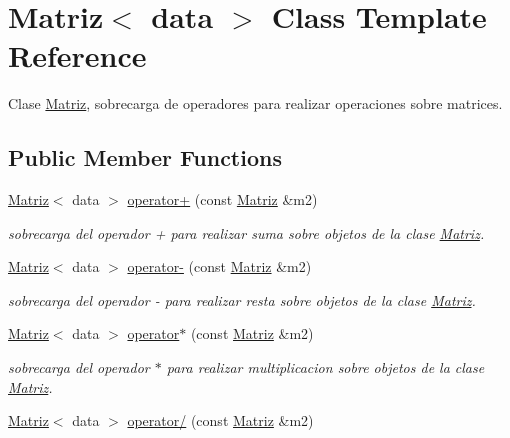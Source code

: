 \hypertarget{classMatriz}{\section{Matriz$<$ data $>$ Class Template Reference}
\label{classMatriz}
}


Clase \hyperlink{classMatriz}{Matriz}, sobrecarga de operadores para realizar operaciones sobre matrices.  


\subsection*{Public Member Functions}
\begin{DoxyCompactItemize}
\item 
\hypertarget{classMatriz_a7c474cdea4e17d6f8619fecd4dabfef2}{\hyperlink{classMatriz}{Matriz}$<$ data $>$ \hyperlink{classMatriz_a7c474cdea4e17d6f8619fecd4dabfef2}{operator+} (const \hyperlink{classMatriz}{Matriz} \&m2)}\label{classMatriz_a7c474cdea4e17d6f8619fecd4dabfef2}

\begin{DoxyCompactList}\small\item\em sobrecarga del operador + para realizar suma sobre objetos de la clase \hyperlink{classMatriz}{Matriz}. \end{DoxyCompactList}\item 
\hypertarget{classMatriz_adfdcb2b3c549301cdde069fb53bb926e}{\hyperlink{classMatriz}{Matriz}$<$ data $>$ \hyperlink{classMatriz_adfdcb2b3c549301cdde069fb53bb926e}{operator-\/} (const \hyperlink{classMatriz}{Matriz} \&m2)}\label{classMatriz_adfdcb2b3c549301cdde069fb53bb926e}

\begin{DoxyCompactList}\small\item\em sobrecarga del operador -\/ para realizar resta sobre objetos de la clase \hyperlink{classMatriz}{Matriz}. \end{DoxyCompactList}\item 
\hypertarget{classMatriz_a76068060d034747c3d8681a0433c20a7}{\hyperlink{classMatriz}{Matriz}$<$ data $>$ \hyperlink{classMatriz_a76068060d034747c3d8681a0433c20a7}{operator$\ast$} (const \hyperlink{classMatriz}{Matriz} \&m2)}\label{classMatriz_a76068060d034747c3d8681a0433c20a7}

\begin{DoxyCompactList}\small\item\em sobrecarga del operador $\ast$ para realizar multiplicacion sobre objetos de la clase \hyperlink{classMatriz}{Matriz}. \end{DoxyCompactList}\item 
\hypertarget{classMatriz_a0058d1bae4ae82252db5716d2a7e4415}{\hyperlink{classMatriz}{Matriz}$<$ data $>$ \hyperlink{classMatriz_a0058d1bae4ae82252db5716d2a7e4415}{operator/} (const \hyperlink{classMatriz}{Matriz} \&m2)}\label{classMatriz_a0058d1bae4ae82252db5716d2a7e4415}


\end{DoxyCompactItemize}
